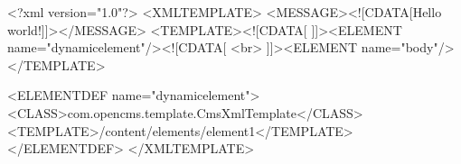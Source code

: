 <?xml version="1.0"?>
<XMLTEMPLATE>
    <MESSAGE><![CDATA[Hello world!]]></MESSAGE>
    <TEMPLATE><![CDATA[
            ]]><ELEMENT name="dynamicelement"/><![CDATA[ <br>
        ]]><ELEMENT name="body"/>
    </TEMPLATE>

    <ELEMENTDEF name="dynamicelement">
        <CLASS>com.opencms.template.CmsXmlTemplate</CLASS>
        <TEMPLATE>/content/elements/element1</TEMPLATE>
    </ELEMENTDEF>
</XMLTEMPLATE>
